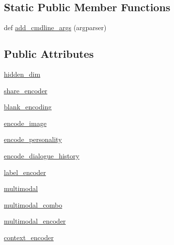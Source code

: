 \subsection*{Static Public Member Functions}
\begin{DoxyCompactItemize}
\item 
def \hyperlink{classtransresnet__multimodal_1_1modules_1_1TransresnetMultimodalModel_ad7697f18fff90dcbfad0f1f53b5e15ef}{add\+\_\+cmdline\+\_\+args} (argparser)
\end{DoxyCompactItemize}
\subsection*{Public Attributes}
\begin{DoxyCompactItemize}
\item 
\hyperlink{classtransresnet__multimodal_1_1modules_1_1TransresnetMultimodalModel_ad2698fb30d8d35e94887affba0850f05}{hidden\+\_\+dim}
\item 
\hyperlink{classtransresnet__multimodal_1_1modules_1_1TransresnetMultimodalModel_a64fa905fd4b3a8a8024190c496cb3b78}{share\+\_\+encoder}
\item 
\hyperlink{classtransresnet__multimodal_1_1modules_1_1TransresnetMultimodalModel_af9cd236b06c97dff73d8636e9ce4c4cd}{blank\+\_\+encoding}
\item 
\hyperlink{classtransresnet__multimodal_1_1modules_1_1TransresnetMultimodalModel_a918e176190eb3aa3d1b4a07f3fc9ed38}{encode\+\_\+image}
\item 
\hyperlink{classtransresnet__multimodal_1_1modules_1_1TransresnetMultimodalModel_a2d2c3250bf7d3552592da75813fa370c}{encode\+\_\+personality}
\item 
\hyperlink{classtransresnet__multimodal_1_1modules_1_1TransresnetMultimodalModel_a40882a05a319d9ad76b9ed310785056a}{encode\+\_\+dialogue\+\_\+history}
\item 
\hyperlink{classtransresnet__multimodal_1_1modules_1_1TransresnetMultimodalModel_a4362c115b423401d6a4a7f0becd101ff}{label\+\_\+encoder}
\item 
\hyperlink{classtransresnet__multimodal_1_1modules_1_1TransresnetMultimodalModel_a91db0743a901b988b167dc903da9da5a}{multimodal}
\item 
\hyperlink{classtransresnet__multimodal_1_1modules_1_1TransresnetMultimodalModel_a781d514d0149942dce4c7a4e2e14a3b4}{multimodal\+\_\+combo}
\item 
\hyperlink{classtransresnet__multimodal_1_1modules_1_1TransresnetMultimodalModel_ad62ff64bec37d5017de0304a906b574c}{multimodal\+\_\+encoder}
\item 
\hyperlink{classtransresnet__multimodal_1_1modules_1_1TransresnetMultimodalModel_a3437ef876c639900ff3adda99ec20f0e}{context\+\_\+encoder}
\end{DoxyCompactItemize}


